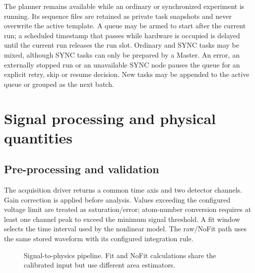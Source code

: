 \documentclass[11pt,oneside,openany]{book}
\begin{document}
The planner remains available while an ordinary or synchronized experiment is running.
Its sequence files are retained as private task snapshots and never overwrite the active
template. A queue may be armed to start after the current run; a scheduled timestamp that
passes while hardware is occupied is delayed until the current run releases the run slot.
Ordinary and SYNC tasks may be mixed, although SYNC tasks can only be prepared by a Master.
An error, an externally stopped run or an unavailable SYNC node pauses the queue for an
explicit retry, skip or resume decision. New tasks may be appended to the active queue or
grouped as the next batch.

\chapter{Signal processing and physical quantities}\label{ch:signal}

\section{Pre-processing and validation}
The acquisition driver returns a common time axis and two detector channels. Gain
correction is applied before analysis. Values exceeding the configured voltage limit are
treated as saturation/error; atom-number conversion requires at least one channel peak
to exceed the minimum signal threshold. A fit window selects the time interval used by
the nonlinear model. The raw/NoFit path uses the same stored waveform with its configured
integration rule.

\begin{figure}[htbp]
\centering
{}
\caption{Signal-to-physics pipeline. Fit and NoFit calculations share the calibrated
input but use different area estimators.}
\label{fig:analysis-pipeline}
\end{figure}
\end{document}
